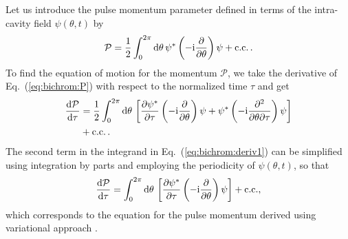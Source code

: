 Let us introduce the pulse momentum parameter \cite{barashenkov2004traveling} defined in terms of the intra-cavity field $\psi(\theta, t)$ by
%
\begin{equation}\label{eq:bichrom:P}
\mathcal{P} = \frac{1}{2} \int_{0}^{2\pi} \mathrm{d} \theta \, \psi^* \left( -\mathrm{i} \frac{\partial}{\partial \theta} \right) \psi + \mathrm{c.c.} \, .
\end{equation}
%
To find the equation of motion for the momentum $\mathcal{P}$, we take the derivative of Eq.~(\ref{eq:bichrom:P}) with respect to the normalized time $\tau$ and get
%
\begin{align}\label{eq:bichrom:deriv1}
\frac{\mathrm{d}\mathcal{P}}{\mathrm{d}\tau} &= \frac{1}{2} \int_{0}^{2\pi} \mathrm{d} \theta \,  \left[ \frac{\partial \psi^*}{\partial \tau} \left( -\mathrm{i} \frac{\partial }{\partial \theta} \right) \psi + \psi^* \left( -\mathrm{i} \frac{\partial^2}{\partial\theta \partial \tau} \right) \psi \right] \nonumber \\
& + \mathrm{c.c.} \, .
\end{align}
%
The second term in the integrand in Eq.~(\ref{eq:bichrom:deriv1}) can be simplified using integration by parts and employing the periodicity of $\psi(\theta, t)$, so that
%
\begin{equation}
\frac{\mathrm{d}\mathcal{P}}{\mathrm{d}\tau} = \int_{0}^{2\pi} \mathrm{d} \theta \, \left[ \frac{\partial \psi^*}{\partial \tau} \left( -\mathrm{i} \frac{\partial }{\partial \theta} \right) \psi  \right] + \mathrm{c.c.},
\end{equation}
%
which corresponds to the equation for the pulse momentum derived using variational approach \cite{vlasov1971averaged,Santhanam2003moments}.

